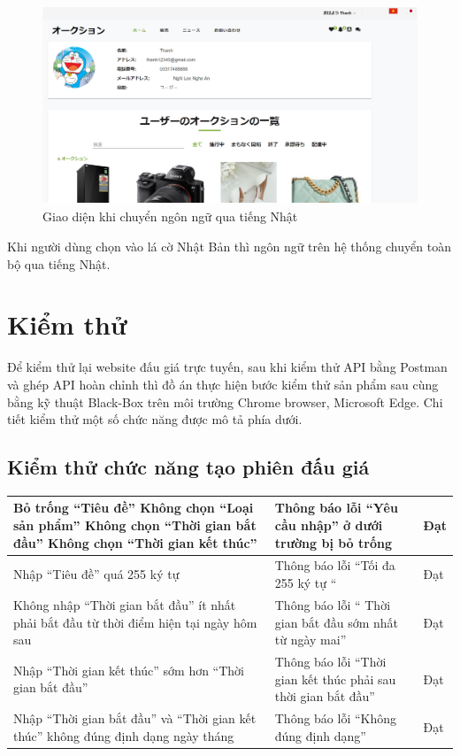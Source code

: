 \documentclass[../DoAn.tex]{subfiles}
\begin{document}
\begin{figure}[H]
    \centering
    \includegraphics[width=0.75\linewidth,height=5.95cm]{Hinhve/jp.png}
    \caption{Giao diện khi chuyển ngôn ngữ qua tiếng Nhật}
    \label{fig:Fig421}
\end{figure}
Khi người dùng chọn vào lá cờ Nhật Bản thì ngôn ngữ trên hệ thống chuyển toàn bộ qua tiếng Nhật.
\section{Kiểm thử}
Để kiểm thử lại website đấu giá trực tuyến, sau khi kiểm thử API bằng Postman và ghép API hoàn chỉnh thì đồ án thực hiện bước kiểm thử sản phẩm sau cùng bằng kỹ thuật Black-Box trên môi trường Chrome browser, Microsoft Edge. Chi tiết kiểm thử một số chức năng được mô tả phía dưới. 
\subsection{Kiểm thử chức năng tạo phiên đấu giá}
    \tabletail{\hline}
    \label{bang413}
    \begin{supertabular}{| p{.45\textwidth}|p{.30\textwidth}|p{.15\textwidth}|} 
    \hline
        Bỏ trống “Tiêu đề”
        Không chọn “Loại sản phẩm”
        Không chọn “Thời gian bắt đầu”
        Không chọn  “Thời gian kết thúc”
        & Thông báo lỗi “Yêu cầu nhập” ở dưới trường bị bỏ trống&Đạt \\\hline
        Nhập “Tiêu đề” quá 255 ký tự
        & Thông báo lỗi “Tối đa 255 ký tự “&Đạt \\\hline
        Không nhập “Thời gian bắt đầu”  ít nhất phải bắt đầu từ thời điểm hiện tại ngày hôm sau
        & Thông báo lỗi “ Thời gian bắt đầu sớm nhất từ ngày mai”&Đạt \\\hline
        Nhập “Thời gian kết thúc” sớm hơn “Thời gian bắt đầu”
        & Thông báo lỗi “Thời gian kết thúc phải sau thời gian bắt đầu”&Đạt \\\hline
        Nhập “Thời gian bắt đầu” và “Thời gian kết thúc” không đúng định dạng ngày tháng
        & Thông báo lỗi “Không đúng định dạng”&Đạt \\\hline
    \end{supertabular}
\end{document}
